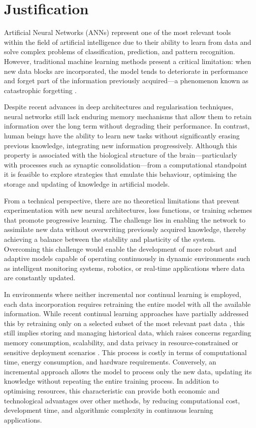 \section{Justification}

Artificial Neural Networks (ANNs) represent one of the most relevant tools within the field of artificial intelligence due to their ability to learn from data and solve complex problems of classification, prediction, and pattern recognition.  
However, traditional machine learning methods present a critical limitation: when new data blocks are incorporated, the model tends to deteriorate in performance and forget part of the information previously acquired—a phenomenon known as catastrophic forgetting \cite{bullinaria2009}.

Despite recent advances in deep architectures and regularisation techniques, neural networks still lack enduring memory mechanisms that allow them to retain information over the long term without degrading their performance.  
In contrast, human beings have the ability to learn new tasks without significantly erasing previous knowledge, integrating new information progressively.  
Although this property is associated with the biological structure of the brain—particularly with processes such as synaptic consolidation—from a computational standpoint it is feasible to explore strategies that emulate this behaviour, optimising the storage and updating of knowledge in artificial models.

From a technical perspective, there are no theoretical limitations that prevent experimentation with new neural architectures, loss functions, or training schemes that promote progressive learning.  
The challenge lies in enabling the network to assimilate new data without overwriting previously acquired knowledge, thereby achieving a balance between the stability and plasticity of the system.  
Overcoming this challenge would enable the development of more robust and adaptive models capable of operating continuously in dynamic environments such as intelligent monitoring systems, robotics, or real-time applications where data are constantly updated.

In environments where neither incremental nor continual learning is employed, each data 
incorporation requires retraining the entire model with all the available information. 
While recent continual learning approaches have partially addressed this by retraining 
only on a selected subset of the most relevant past data \cite{rebuffi2017icarl, 
krawczyk2017ensemble}, this still implies storing and managing historical data, which 
raises concerns regarding memory consumption, scalability, and data privacy in 
resource-constrained or sensitive deployment scenarios \cite{de2021continual}.  
This process is costly in terms of computational time, energy consumption, and hardware requirements.  
Conversely, an incremental approach allows the model to process only the new data, updating its knowledge without repeating the entire training process.  
In addition to optimising resources, this characteristic can provide both economic and technological advantages over other methods, by reducing computational cost, development time, and algorithmic complexity in continuous learning applications.

